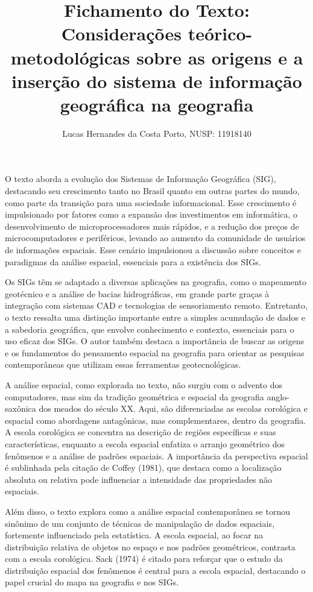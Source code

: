 \documentclass[
]{article}
\title{Fichamento do Texto: Considerações teórico-metodológicas sobre as
origens e a inserção do sistema de informação geográfica na geografia}
\author{Lucas Hernandes da Costa Porto, NUSP: 11918140}
\date{}
\begin{document}
\maketitle

O texto aborda a evolução dos Sistemas de Informação Geográfica (SIG),
destacando seu crescimento tanto no Brasil quanto em outras partes do
mundo, como parte da transição para uma sociedade informacional. Esse
crescimento é impulsionado por fatores como a expansão dos investimentos
em informática, o desenvolvimento de microprocessadores mais rápidos, e
a redução dos preços de microcomputadores e periféricos, levando ao
aumento da comunidade de usuários de informações espaciais. Esse cenário
impulsionou a discussão sobre conceitos e paradigmas da análise
espacial, essenciais para a existência dos SIGs.

Os SIGs têm se adaptado a diversas aplicações na geografia, como o
mapeamento geotécnico e a análise de bacias hidrográficas, em grande
parte graças à integração com sistemas CAD e tecnologias de
sensoriamento remoto. Entretanto, o texto ressalta uma distinção
importante entre a simples acumulação de dados e a sabedoria geográfica,
que envolve conhecimento e contexto, essenciais para o uso eficaz dos
SIGs. O autor também destaca a importância de buscar as origens e os
fundamentos do pensamento espacial na geografia para orientar as
pesquisas contemporâneas que utilizam essas ferramentas geotecnológicas.

A análise espacial, como explorada no texto, não surgiu com o advento
dos computadores, mas sim da tradição geométrica e espacial da geografia
anglo-saxônica dos meados do século XX. Aqui, são diferenciadas as
escolas corológica e espacial como abordagens antagônicas, mas
complementares, dentro da geografia. A escola corológica se concentra na
descrição de regiões específicas e suas características, enquanto a
escola espacial enfatiza o arranjo geométrico dos fenômenos e a análise
de padrões espaciais. A importância da perspectiva espacial é sublinhada
pela citação de Coffey (1981), que destaca como a localização absoluta
ou relativa pode influenciar a intensidade das propriedades não
espaciais.

Além disso, o texto explora como a análise espacial contemporânea se
tornou sinônimo de um conjunto de técnicas de manipulação de dados
espaciais, fortemente influenciado pela estatística. A escola espacial,
ao focar na distribuição relativa de objetos no espaço e nos padrões
geométricos, contrasta com a escola corológica. Sack (1974) é citado
para reforçar que o estudo da distribuição espacial dos fenômenos é
central para a escola espacial, destacando o papel crucial do mapa na
geografia e nos SIGs.
\end{document}
